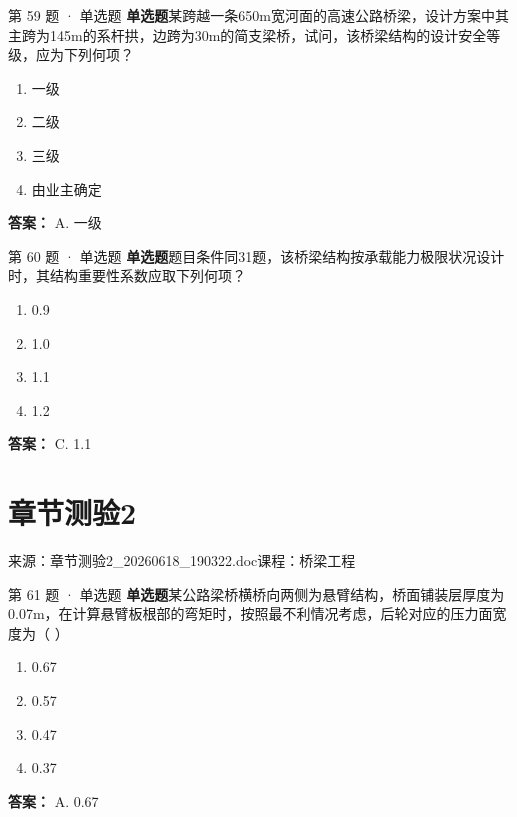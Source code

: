 \documentclass[UTF8,zihao=-4,openany]{ctexbook}
\newenvironment{choices}{\begin{enumerate}[label=\Alph*.,leftmargin=9mm,labelsep=3mm,itemsep=2pt,topsep=4pt]}{\end{enumerate}}
\newcommand{\qtype}[1]{\textcolor{brand}{\sffamily\bfseries #1}}
\newcommand{\sourcefile}[1]{\textcolor{muted}{\small\sffamily 来源：#1}}
\begin{document}
\begin{questionbox}{第 59 题 · 单选题}
\qtype{单选题}\quad 某跨越一条650m宽河面的高速公路桥梁，设计方案中其主跨为145m的系杆拱，边跨为30m的简支梁桥，试问，该桥梁结构的设计安全等级，应为下列何项？
\begin{choices}
\item 一级
\item 二级
\item 三级
\item 由业主确定
\end{choices}
\begin{answerbox}
\textbf{答案：} A. 一级
\end{answerbox}
\end{questionbox}

\begin{questionbox}{第 60 题 · 单选题}
\qtype{单选题}\quad 题目条件同31题，该桥梁结构按承载能力极限状况设计时，其结构重要性系数应取下列何项？
\begin{choices}
\item 0.9
\item 1.0
\item 1.1
\item 1.2
\end{choices}
\begin{answerbox}
\textbf{答案：} C. 1.1
\end{answerbox}
\end{questionbox}

\chapter{章节测验2}

\sourcefile{章节测验2\_20260618\_190322.doc}\quad \textcolor{muted}{\small\sffamily 课程：桥梁工程}

\begin{questionbox}{第 61 题 · 单选题}
\qtype{单选题}\quad 某公路梁桥横桥向两侧为悬臂结构，桥面铺装层厚度为0.07m，在计算悬臂板根部的弯矩时，按照最不利情况考虑，后轮对应的压力面宽度为（ ）
\begin{choices}
\item 0.67
\item 0.57
\item 0.47
\item 0.37
\end{choices}
\begin{answerbox}
\textbf{答案：} A. 0.67
\end{answerbox}
\end{questionbox}
\end{document}
